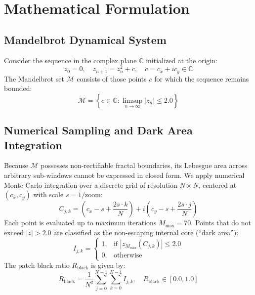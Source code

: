 \documentclass[10pt,journal,compsoc,twocolumn]{article}
\begin{document}
\section{Mathematical Formulation}

\subsection{Mandelbrot Dynamical System}
Consider the sequence in the complex plane $\mathbb{C}$ initialized at the origin:
\begin{equation}
z_0 = 0, \quad z_{n+1} = z_n^2 + c, \quad c = c_x + i c_y \in \mathbb{C}
\end{equation}
The Mandelbrot set $\mathcal{M}$ consists of those points $c$ for which the sequence remains bounded:
\begin{equation}
\mathcal{M} = \left\{ c \in \mathbb{C} : \limsup_{n \to \infty} |z_n| \le 2.0 \right\}
\end{equation}

\subsection{Numerical Sampling and Dark Area Integration}
Because $\mathcal{M}$ possesses non-rectifiable fractal boundaries, its Lebesgue area across arbitrary sub-windows cannot be expressed in closed form. We apply numerical Monte Carlo integration over a discrete grid of resolution $N \times N$, centered at $(c_x, c_y)$ with scale $s = 1 / \text{zoom}$:
\begin{equation}
C_{j,k} = \left( c_x - s + \frac{2s \cdot k}{N} \right) + i \left( c_y - s + \frac{2s \cdot j}{N} \right)
\end{equation}
Each point is evaluated up to maximum iterations $M_{\text{max}} = 70$. Points that do not exceed $|z| > 2.0$ are classified as the non-escaping internal core (``dark area''):
\begin{equation}
I_{j,k} = \begin{cases} 1, & \text{if } |z_{M_{\text{max}}}(C_{j,k})| \le 2.0 \\ 0, & \text{otherwise} \end{cases}
\end{equation}
The patch black ratio $R_{\text{black}}$ is given by:
\begin{equation}
R_{\text{black}} = \frac{1}{N^2} \sum_{j=0}^{N-1} \sum_{k=0}^{N-1} I_{j,k}, \quad R_{\text{black}} \in [0.0, 1.0]
\end{equation}
\end{document}
